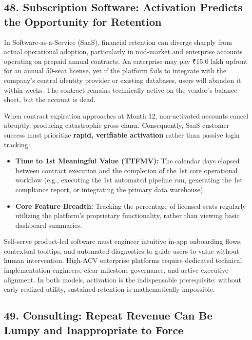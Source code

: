 \subsection*{48. Subscription Software: Activation Predicts the Opportunity for Retention}

In Software-as-a-Service (SaaS), financial retention can diverge sharply from actual operational adoption, particularly in mid-market and enterprise accounts operating on prepaid annual contracts. An enterprise may pay ₹15.0 lakh upfront for an annual 50-seat license, yet if the platform fails to integrate with the company's central identity provider or existing databases, users will abandon it within weeks. The contract remains technically active on the vendor's balance sheet, but the account is dead.

When contract expiration approaches at Month 12, non-activated accounts cancel abruptly, producing catastrophic gross churn. Consequently, SaaS customer success must prioritize \textbf{rapid, verifiable activation} rather than passive login tracking:
\begin{itemize}[leftmargin=*]
\item \textbf{Time to 1st Meaningful Value (TTFMV):} The calendar days elapsed between contract execution and the completion of the 1st core operational workflow (e.g., executing the 1st automated pipeline run, generating the 1st compliance report, or integrating the primary data warehouse).
\item \textbf{Core Feature Breadth:} Tracking the percentage of licensed seats regularly utilizing the platform's proprietary functionality, rather than viewing basic dashboard summaries.
\end{itemize}

Self-serve product-led software must engineer intuitive in-app onboarding flows, contextual tooltips, and automated diagnostics to guide users to value without human intervention. High-ACV enterprise platforms require dedicated technical implementation engineers, clear milestone governance, and active executive alignment. In both models, activation is the indispensable prerequisite: without early realized utility, sustained retention is mathematically impossible.

\subsection*{49. Consulting: Repeat Revenue Can Be Lumpy and Inappropriate to Force}

